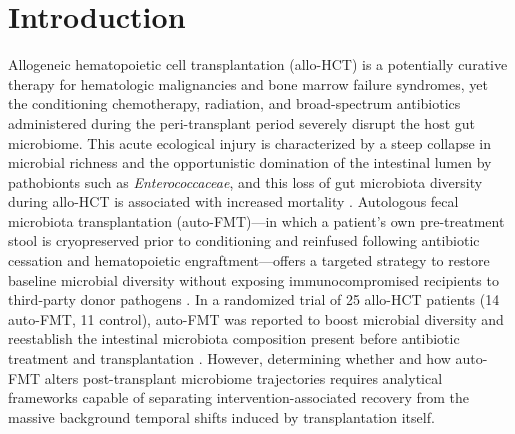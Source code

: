 
\section{Introduction}

Allogeneic hematopoietic cell transplantation (allo-HCT) is a potentially curative therapy for hematologic malignancies and bone marrow failure syndromes, yet the conditioning chemotherapy, radiation, and broad-spectrum antibiotics administered during the peri-transplant period severely disrupt the host gut microbiome. This acute ecological injury is characterized by a steep collapse in microbial richness and the opportunistic domination of the intestinal lumen by pathobionts such as \textit{Enterococcaceae}, and this loss of gut microbiota diversity during allo-HCT is associated with increased mortality \citep{taur2018reconstitution}. Autologous fecal microbiota transplantation (auto-FMT)---in which a patient's own pre-treatment stool is cryopreserved prior to conditioning and reinfused following antibiotic cessation and hematopoietic engraftment---offers a targeted strategy to restore baseline microbial diversity without exposing immunocompromised recipients to third-party donor pathogens \citep{herman2024assessing,herman2024assessingb}. In a randomized trial of 25 allo-HCT patients (14 auto-FMT, 11 control), auto-FMT was reported to boost microbial diversity and reestablish the intestinal microbiota composition present before antibiotic treatment and transplantation \citep{taur2018reconstitution}. However, determining whether and how auto-FMT alters post-transplant microbiome trajectories requires analytical frameworks capable of separating intervention-associated recovery from the massive background temporal shifts induced by transplantation itself.

